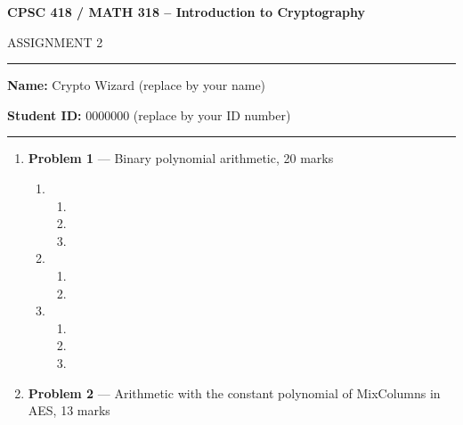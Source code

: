 \documentclass[11pt]{article}
\theoremstyle{definition}
\begin{document}
\begin{center}
{\bf \Large CPSC 418 / MATH 318 -- Introduction to Cryptography

ASSIGNMENT 2}
\end{center}

\hrule 	

\textbf{Name:} Crypto Wizard (replace by your name)

\textbf{Student ID:} 0000000 (replace by your ID number)

\medskip \hrule

\begin{enumerate}

	\item[] \textbf{Problem 1} ---  Binary polynomial arithmetic, 20 marks
	
	\begin{enumerate}
		\item %
		
		\begin{enumerate}
			\item %
			
			\item %
			
			\item %
		
		\end{enumerate}
	
		\item %
			
		\begin{enumerate}
			\item %
			
			\item %
		
		\end{enumerate}
	
		\item %
		
		\begin{enumerate}
		
		\item %
		
		\item %
		
		\item %
		\end{enumerate}
	\end{enumerate}
	
	
	\item[] \textbf{Problem 2} ---  Arithmetic with the constant polynomial of {\sc MixColumns} in
	    AES, 13 marks
	

\end{enumerate}
\end{document}
